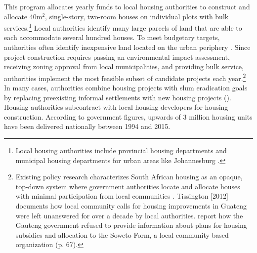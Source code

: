 \documentclass[12pt]{article}
\begin{document}
This program allocates yearly funds to local housing authorities to construct and allocate 40m$^2$, single-story, two-room houses on individual plots with bulk services.\footnote{Local housing authorities include provincial housing departments and municipal housing departments for urban areas like Johannesburg \citep{dhsreports}.}  Local authorities identify many large parcels of land that are able to each accommodate several hundred houses.  To meet budgetary targets, authorities often identify inexpensive land located on the urban periphery \citep{beninterview,dhsreports}.  Since project construction requires passing an environmental impact assessment, receiving zoning approval from local municipalities, and providing bulk service, authorities implement the most feasible subset of candidate projects each year.\footnote{Existing policy research characterizes South African housing as an opaque, top-down system where government authorities locate and allocate houses with minimal participation from local communities \citep{seriq}.  Tissington [2012] documents how local community calls for housing improvements in Guateng were left unanswered for over a decade by local authorities.  \cite{seriq} report how the Gauteng government refused to provide information about plans for housing subsidies and allocation to the Soweto Form, a local community based organization (p. 67).}  In many cases, authorities combine housing projects with slum eradication goals by replacing preexisting informal settlements with new housing projects (\cite{hofmeyr2008risk}).  Housing authorities subcontract with local housing developers for housing construction.  According to government figures, upwards of 3 million housing units have been delivered nationally between 1994 and 2015.










\end{document}
